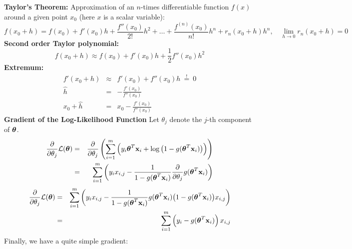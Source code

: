  \textbf{Taylor's Theorem:} Approximation of an $n$-times differentiable function $f(x)$ around a given point $x_0$ (here $x$ is a scalar variable):
   {\small
  \begin{displaymath}
    f(x_0+h) = f(x_0) + f'(x_0) h + \frac{f''(x_0)}{2!} h^2 + \ldots +
           \frac{f^{(n)}(x_0)}{n!} h^n + r_n(x_0 + h) h^n, 
           \quad \lim_{h \rightarrow 0} r_n(x_0 + h) = 0
  \end{displaymath}
  }
  \textbf{Second order Taylor polynomial:}
  \begin{displaymath}
    f(x_0 + h) \approx f(x_0) + f'(x_0) h + \frac{1}{2} f''(x_0) h^2
  \end{displaymath}
\textbf{Extremum:}
  \begin{eqnarray*}
    f'(x_0 + h)         & \approx & f'(x_0) + f''(x_0) h ~\stackrel{!}{=}~ 0 \\[.3cm]
                \hat{h} & = & - \frac{f'(x_0)}{f''(x_0)} \\[.3cm]
    x_0 + \hat{h} & = & x_0 - \frac{f'(x_0)}{f''(x_0)} 
  \end{eqnarray*}
  \textbf{Gradient of the Log-Likelihood Function}
  \noindent Let $\theta_j$ denote the $j$-th component of $\bm{\mathrm{\theta}}$.
  {\small
  \begin{eqnarray*}
    \frac{\partial}{\partial \theta_j} \mathcal{L}(\bm{\mathrm{\theta}})
      &=& \frac{\partial}{\partial \theta_j} \left( \sum_{i=1}^m \left( y_i \bm{\mathrm{\theta}}^T \bm{\mathrm{x}}_i + \log \big( 1 - g(\bm{\mathrm{\theta}}^T \bm{\mathrm{x}}_i) \big) \right) \right)\\ 
      &=& \sum_{i=1}^m \left( y_i x_{i,j} - \frac{1}{1-g(\bm{\mathrm{\theta}}^T\bm{\mathrm{x}}_i)} \frac{\partial}{\partial \theta_j}g(\bm{\mathrm{\theta}}^T \bm{\mathrm{x}}_i) \right)
  \end{eqnarray*}
  }
   {\small
  \begin{eqnarray*}
     \frac{\partial}{\partial \theta_j} \mathcal{L}(\bm{\mathrm{\theta}}) 
       &=& \sum_{i=1}^m \left( y_i x_{i,j} - \frac{1}{1-g(\bm{\mathrm{\theta}}^T\bm{\mathrm{x}}_i)} g(\bm{\mathrm{\theta}}^T \bm{\mathrm{x}}_i) \big(1-g(\bm{\mathrm{\theta}}^T \bm{\mathrm{x}}_i)\big) x_{i,j} \right) \\ 
       &=& \sum_{i=1}^m \left( y_i - g(\bm{\mathrm{\theta}}^T\bm{\mathrm{x}}_i) \right) x_{i,j}
  \end{eqnarray*}
  } 
   Finally, we have a quite simple gradient: 
   
